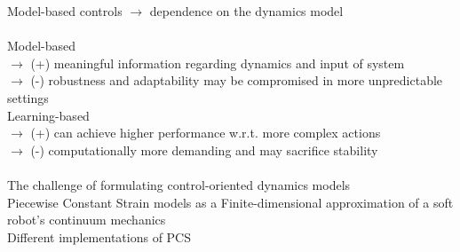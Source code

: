 Model-based controls $\rightarrow$ dependence on the dynamics model\\
\\  %
Model-based\\
$\rightarrow$ (+) meaningful information regarding dynamics and input of system\\
$\rightarrow$ (-) robustness and adaptability may be compromised in more unpredictable settings\\  
Learning-based\\
$\rightarrow$ (+) can achieve higher performance w.r.t. more complex actions\\
$\rightarrow$ (-) computationally more demanding and may sacrifice stability\\
\\
The challenge of formulating control-oriented dynamics models\\     %
Piecewise Constant Strain models as a Finite-dimensional            %
approximation of a soft robot's continuum mechanics\\
Different implementations of PCS                                    %